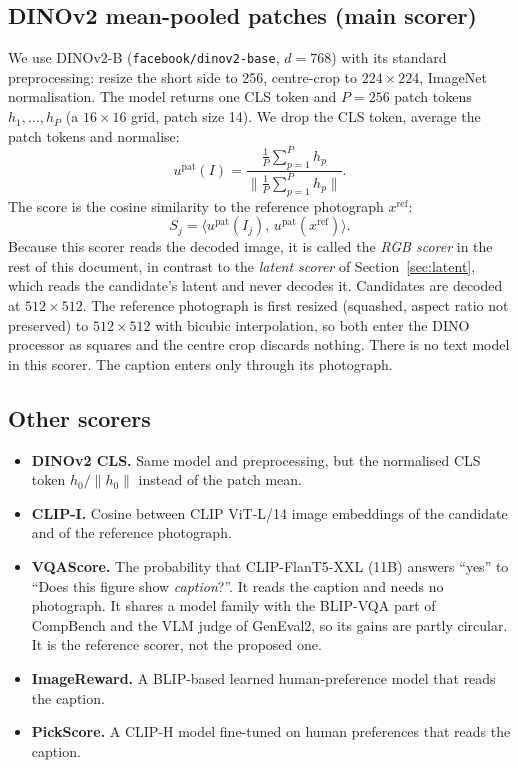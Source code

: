 \documentclass[11pt,a4paper]{article}
\begin{document}
\subsection{DINOv2 mean-pooled patches (main scorer)}
We use DINOv2-B (\texttt{facebook/dinov2-base}, $d=768$) with its standard preprocessing: resize the short side to 256, centre-crop to $224\times224$, ImageNet normalisation. The model returns one CLS token and $P=256$ patch tokens $h_1,\dots,h_P$ (a $16\times16$ grid, patch size 14). We drop the CLS token, average the patch tokens and normalise:
\begin{equation}
u^{\mathrm{pat}}(I)=\frac{\frac{1}{P}\sum_{p=1}^{P}h_p}{\big\lVert\frac{1}{P}\sum_{p=1}^{P}h_p\big\rVert}.
\end{equation}
The score is the cosine similarity to the reference photograph $x^{\mathrm{ref}}$:
\begin{equation}
S_j=\big\langle u^{\mathrm{pat}}(I_j),\,u^{\mathrm{pat}}(x^{\mathrm{ref}})\big\rangle.
\end{equation}
Because this scorer reads the decoded image, it is called the \emph{RGB scorer} in the rest of this document, in contrast to the \emph{latent scorer} of Section~\ref{sec:latent}, which reads the candidate's latent and never decodes it. Candidates are decoded at $512\times512$. The reference photograph is first resized (squashed, aspect ratio not preserved) to $512\times512$ with bicubic interpolation, so both enter the DINO processor as squares and the centre crop discards nothing. There is no text model in this scorer. The caption enters only through its photograph.

\subsection{Other scorers}
\begin{itemize}
\item \textbf{DINOv2 CLS.} Same model and preprocessing, but the normalised CLS token $h_0/\lVert h_0\rVert$ instead of the patch mean.
\item \textbf{CLIP-I.} Cosine between CLIP ViT-L/14 image embeddings of the candidate and of the reference photograph.
\item \textbf{VQAScore.} The probability that CLIP-FlanT5-XXL (11B) answers ``yes'' to ``Does this figure show \emph{caption}?''. It reads the caption and needs no photograph. It shares a model family with the BLIP-VQA part of CompBench and the VLM judge of GenEval2, so its gains are partly circular. It is the reference scorer, not the proposed one.
\item \textbf{ImageReward.} A BLIP-based learned human-preference model that reads the caption.
\item \textbf{PickScore.} A CLIP-H model fine-tuned on human preferences that reads the caption.
\end{itemize}
\end{document}
